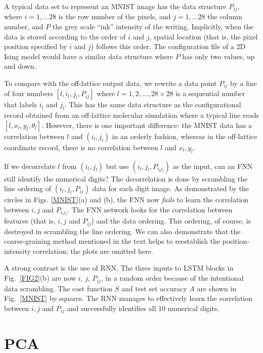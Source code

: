 A typical data set to represent an MNIST image has the data structure $P_{ij}$, where $i=1,...28$ is the row number of the pixels, and $j=1,...28$ the column number, and $P$ the grey scale ``ink'' intensity of the writing. Implicitly, when the data is stored according to the order of $i$ and $j$, spatial location (that is, the pixel position specified by $i$ and $j$) follows this order. The configuration file of a 2D Ising model would have a similar data structure where $P$ has only two values, up and down.

To compare with the off-lattice output data, we rewrite a data point $P_{ij}$ by a line of four numbers $[l, i_l, j_l, P_{ij}]$ where $l
=1,2,\dots,28\times 28$ is a sequential number that labels $i_l$ and $j_l$. This has the same data structure as the configurational record obtained from an off-lattice molecular simulation where a typical line reads $[l, x_l, y_l, \theta_l]$. However, there is one important difference: the MNIST data has a correlation between $l$ and $(i_l, j_l)$ in an orderly fashion, whereas in the off-lattice coordinate record, there is no correlation between $l$ and $x_l, y_l$.

If we decorrelate $l$ from $(i_l, j_l)$ but use $(i_l, j_l, P_{i_lj_l})$ as the input, can an FNN still identify the numerical digits? The decorrelation is done by scrambling the line ordering of  $(i_l, j_l, P_{ij})$ data for each digit image.
As demonstrated by the circles in Figs. \ref{MNIST}(a) and (b), the FNN now {\emph {fails}} to learn the correlation between $i, j$ and $P_{i_lj_l}$.
The FNN network looks for the correlation between features (that is, $i, j$ and $P_{ij}$) and the data ordering. This ordering, of course, is destroyed in scrambling the line ordering. We can also demonstrate that the coarse-graining method mentioned in the text helps to reestablish the position-intensity correlation; the plots are omitted here.

A strong contrast is the use of RNN. The three inputs to LSTM blocks in Fig.\ \ref{FIG2}(b) are now $i$, $j$, $P_{ij}$, in a random order because of the intentional data scrambling.
The cost function $S$ and test set accuracy $A$ are shown in Fig.~\ref{MNIST} by squares. The RNN manages to effectively learn the correlation between $i, j$ and $P_{ij}$ and successfully identifies all 10 numerical digits.

\vfill

\section{PCA}

